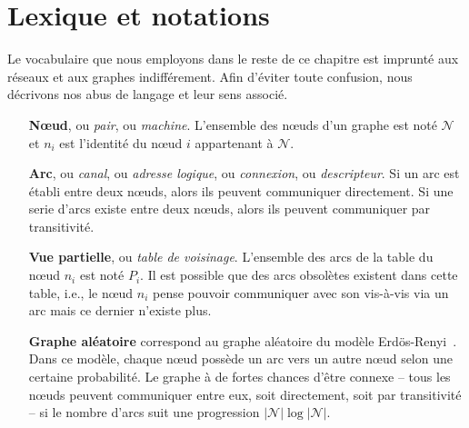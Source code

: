 
\section{Lexique et notations}
\label{net:sec:lexique}

Le vocabulaire que nous employons dans le reste de ce chapitre est imprunté aux
réseaux et aux graphes indifférement. Afin d'éviter toute confusion, nous
décrivons nos abus de langage et leur sens associé.

\begin{itemize}
\item [\textbf{Nœud},] ou \emph{pair}, ou \emph{machine}. L'ensemble des nœuds
  d'un graphe est noté $\mathcal{N}$ et $n_i$ est l'identité du nœud $i$
  appartenant à $\mathcal{N}$.
\item [\textbf{Arc},] ou \emph{canal}, ou \emph{adresse logique}, ou
  \emph{connexion}, ou \emph{descripteur}. Si un arc est établi entre deux
  nœuds, alors ils peuvent communiquer directement. Si une serie d'arcs existe
  entre deux nœuds, alors ils peuvent communiquer par transitivité.
\item [\textbf{Vue partielle},] ou \emph{table de voisinage}. L'ensemble des
  arcs de la table du nœud $n_i$ est noté $P_i$. Il est possible que des arcs
  obsolètes existent dans cette table, i.e., le nœud $n_i$ pense pouvoir
  communiquer avec son vis-à-vis via un arc mais ce dernier n'existe plus.
\item [\textbf{Graphe aléatoire}] correspond au graphe aléatoire du modèle
  Erdös-Renyi~\cite{erdos1959random}. Dans ce modèle, chaque nœud possède un
  arc vers un autre nœud selon une certaine probabilité. Le graphe à de fortes
  chances d'être connexe -- tous les nœuds peuvent communiquer entre eux, soit
  directement, soit par transitivité -- si le nombre d'arcs suit une progression
  $|\mathcal{N}|\log |\mathcal{N}|$.
\item [\textbf{\TODO{Autre}}]
\end{itemize}

